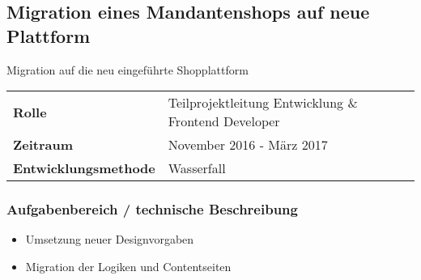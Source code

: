 \documentclass[10pt,ngerman,a4paper]{article}
\begin{document}
\subsection{Migration eines Mandantenshops auf neue Plattform}
Migration auf die neu eingeführte Shopplattform

\begin{tabular}{ll}
\textbf{Rolle} & Teilprojektleitung Entwicklung \& Frontend Developer \\
\textbf{Zeitraum} & November 2016 - März 2017\\
\textbf{Entwicklungsmethode} & Wasserfall
\end{tabular}

\subsubsection{Aufgabenbereich / technische Beschreibung}
\begin{itemize}
\item Umsetzung neuer Designvorgaben
\item Migration der Logiken und Contentseiten
\end{itemize}

\end{document}
